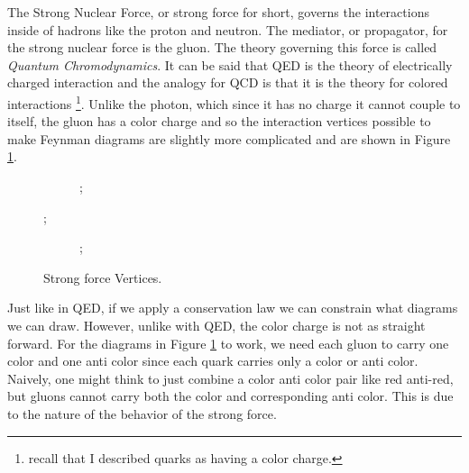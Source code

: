 The Strong Nuclear Force, or strong force for short, governs the interactions inside of hadrons like the proton and neutron. The mediator, or propagator, for the strong nuclear force is the gluon. The theory governing this force is called \textit{Quantum Chromodynamics}.
It can be said that QED is the theory of electrically charged interaction and the analogy for QCD is that it is the theory for colored interactions \footnote{recall that I described quarks as having a color charge.}.
Unlike the photon, which since it has no charge it cannot couple to itself, the gluon has a color charge and so the interaction vertices possible to make Feynman diagrams are slightly more complicated and are shown in Figure \ref{fig:fig_1-6}.
\begin{figure} %
   \centering
   \begin{subfigure}[t]{0.49\textwidth}
      ;
   \end{subfigure}
   ;
   \begin{subfigure}[t]{0.49\textwidth}
      ;
   \end{subfigure}

   \caption{Strong force Vertices.}
   \label{fig:fig_1-6}
\end{figure}
Just like in QED, if we apply a conservation law we can constrain what diagrams we can draw. However, unlike with QED, the color charge is not as straight forward.
For the diagrams in Figure \ref{fig:fig_1-6} to work, we need each gluon to carry one color and one anti color since each quark carries only a color or anti color.
Naively, one might think to just combine a color anti color pair like red anti-red, but gluons cannot carry both the color and corresponding anti color.
This is due to the nature of the behavior of the strong force. 

